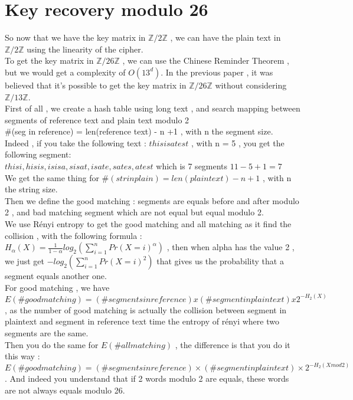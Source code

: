 \documentclass{article}
\begin{document}
\section{Key recovery modulo 26}
So now that we have the key matrix in $\mathbb{Z}/2\mathbb{Z}$ , we can have the plain text in $\mathbb{Z}/2\mathbb{Z}$ using the linearity of the cipher.\\
To get the key matrix in $\mathbb{Z}/26\mathbb{Z}$ , we can use the Chinese Reminder Theorem , but we would get a complexity of $O(13^d)$. In the previous paper , it was believed that it's possible to get the key matrix in $\mathbb{Z}/26\mathbb{Z}$ without considering $\mathbb{Z}/13\mathbb{Z}$.\\
First of all , we create a hash table using long text , and search mapping between segments of reference text and plain text modulo 2\\
\#(seg in reference) = len(reference text) - n +1 , with n the segment size.\\
Indeed , if you take the following text : $thisisatest$ , with n = 5 , you get the following segment:\\
 $ thisi , hisis , isisa , sisat , isate , sates , atest $ which is 7 segments $ 11 - 5 + 1 = 7 $\\
${}$\hspace{1em}We get the same thing for $\#(str in plain) = len(plain text) - n +1$ , with n the string size.\\
Then we define the good matching : segments are equals before and after modulo 2 , and bad matching segment which are not equal but equal modulo 2.\\
We use Rényi entropy to get the good matching and all matching as it find the collision , with the following formula :\\
$H_{\alpha}(X) = \frac{1}{1-\alpha}log_{2}(\sum_{i=1}^{n}{Pr(X=i)^{\alpha}})$ , then when alpha has the value 2 , we just get $-log_{2}(\sum_{i=1}^{n}{Pr(X=i)^{2}})$ that gives us the probability that a segment equals another one.\\
${}$\hspace{1em}For good matching , we have $E(\# good matching) = (\# segments in reference) x (\#segment in plaintext) x 2^{-H_{2}(X)}$ , as the number of good matching is actually the collision between segment in plaintext and segment in reference text time the entropy of rényi where two segments are the same.\\
Then you do the same for  $E(\# all matching)$ , the difference is that you do it this way : $E(\# good matching) = (\# segments in reference) \times (\#segment in plaintext) \times 2^{-H_{2}(X mod 2)}$ . And indeed you understand that if 2 words modulo 2 are equals, these words are not always equals modulo 26.\\
\end{document}
